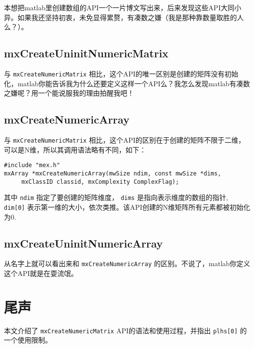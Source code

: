 \documentclass[10pt,a4paper,UTF8]{article}
\begin{document}
本想把matlab里创建数组的API一个一片博文写出来，后来发现这些API大同小异。如果我还坚持初衷，未免显得累赘，有凑数之嫌（我是那种靠数量取胜的人么？）。
\subsection{mxCreateUninitNumericMatrix}
\label{sec:orgheadline4}


与 \texttt{mxCreateNumericMatrix} 相比，这个API的唯一区别是创建的矩阵没有初始化，matlab你能告诉我为什么还要定义这样一个API么？我怎么发现matlab有凑数之嫌呢？用一个能说服我的理由拍醒我吧！
\subsection{mxCreateNumericArray}
\label{sec:orgheadline5}


与 \texttt{mxCreateNumericMatrix} 相比，这个API的区别在于创建的矩阵不限于二维，可以是N维，所以其调用语法略有不同，如下：
\lstset{language=C,label= ,caption= ,captionpos=b,numbers=none}
\begin{lstlisting}
#include "mex.h"
mxArray *mxCreateNumericArray(mwSize ndim, const mwSize *dims,
	 mxClassID classid, mxComplexity ComplexFlag);
\end{lstlisting}
其中 \texttt{ndim} 指定了要创建的矩阵维度， \texttt{dims} 是指向表示维度的数组的指针, \texttt{dim[0]} 表示第一维的大小，依次类推。该API创建的N维矩阵所有元素都被初始化为0.
\subsection{mxCreateUninitNumericArray}
\label{sec:orgheadline6}


从名字上就可以看出来和 \texttt{mxCreateNumericArray} 的区别。不说了，matlab你定义这个API就是在耍流氓。

\section{尾声}
\label{sec:orgheadline8}



本文介绍了 \texttt{mxCreateNumericMatrix} API的语法和使用过程，并指出 \texttt{plhs[0]} 的一个使用限制。
\end{document}
